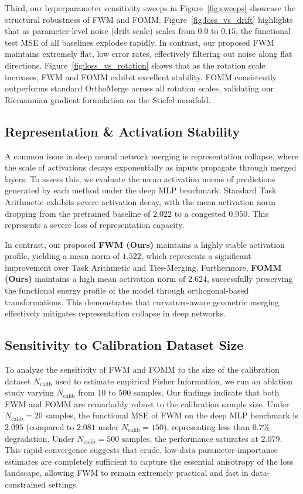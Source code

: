 \documentclass{article}
\theoremstyle{plain}
\theoremstyle{definition}
\theoremstyle{remark}
\begin{document}
Third, our hyperparameter sensitivity sweeps in Figure~\ref{fig:sweeps} showcase the structural robustness of FWM and FOMM. Figure~\ref{fig:loss_vs_drift} highlights that as parameter-level noise (drift scale) scales from $0.0$ to $0.15$, the functional test MSE of all baselines explodes rapidly. In contrast, our proposed FWM maintains extremely flat, low error rates, effectively filtering out noise along flat directions. Figure~\ref{fig:loss_vs_rotation} shows that as the rotation scale increases, FWM and FOMM exhibit excellent stability. FOMM consistently outperforms standard OrthoMerge across all rotation scales, validating our Riemannian gradient formulation on the Stiefel manifold.

\subsection{Representation \& Activation Stability}
A common issue in deep neural network merging is representation collapse, where the scale of activations decays exponentially as inputs propagate through merged layers. To assess this, we evaluate the mean activation norms of predictions generated by each method under the deep MLP benchmark. Standard Task Arithmetic exhibits severe activation decay, with the mean activation norm dropping from the pretrained baseline of $2.022$ to a congested $0.950$. This represents a severe loss of representation capacity. 

In contrast, our proposed \textbf{FWM (Ours)} maintains a highly stable activation profile, yielding a mean norm of $1.522$, which represents a significant improvement over Task Arithmetic and Ties-Merging. Furthermore, \textbf{FOMM (Ours)} maintains a high mean activation norm of $2.624$, successfully preserving the functional energy profile of the model through orthogonal-based transformations. This demonstrates that curvature-aware geometric merging effectively mitigates representation collapse in deep networks.

\subsection{Sensitivity to Calibration Dataset Size}
To analyze the sensitivity of FWM and FOMM to the size of the calibration dataset $N_{\text{calib}}$ used to estimate empirical Fisher Information, we run an ablation study varying $N_{\text{calib}}$ from $10$ to $500$ samples. Our findings indicate that both FWM and FOMM are remarkably robust to the calibration sample size. Under $N_{\text{calib}} = 20$ samples, the functional MSE of FWM on the deep MLP benchmark is $2.095$ (compared to $2.081$ under $N_{\text{calib}}=150$), representing less than $0.7\%$ degradation. Under $N_{\text{calib}} = 500$ samples, the performance saturates at $2.079$. This rapid convergence suggests that crude, low-data parameter-importance estimates are completely sufficient to capture the essential anisotropy of the loss landscape, allowing FWM to remain extremely practical and fast in data-constrained settings.
\end{document}

